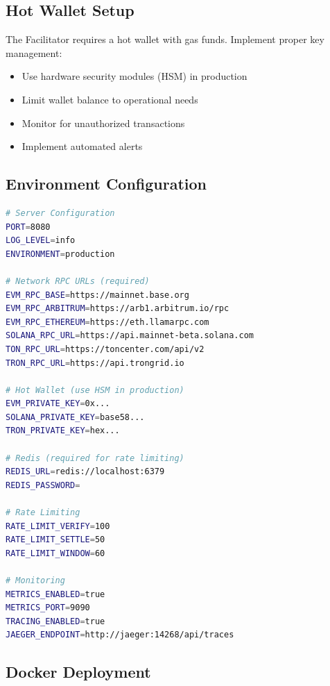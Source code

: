 \subsection{Hot Wallet Setup}

\begin{warningbox}
The Facilitator requires a hot wallet with gas funds. Implement proper key management:
\begin{itemize}
    \item Use hardware security modules (HSM) in production
    \item Limit wallet balance to operational needs
    \item Monitor for unauthorized transactions
    \item Implement automated alerts
\end{itemize}
\end{warningbox}

\subsection{Environment Configuration}

\begin{lstlisting}[language=bash,caption={Facilitator environment variables}]
# Server Configuration
PORT=8080
LOG_LEVEL=info
ENVIRONMENT=production

# Network RPC URLs (required)
EVM_RPC_BASE=https://mainnet.base.org
EVM_RPC_ARBITRUM=https://arb1.arbitrum.io/rpc
EVM_RPC_ETHEREUM=https://eth.llamarpc.com
SOLANA_RPC_URL=https://api.mainnet-beta.solana.com
TON_RPC_URL=https://toncenter.com/api/v2
TRON_RPC_URL=https://api.trongrid.io

# Hot Wallet (use HSM in production)
EVM_PRIVATE_KEY=0x...
SOLANA_PRIVATE_KEY=base58...
TRON_PRIVATE_KEY=hex...

# Redis (required for rate limiting)
REDIS_URL=redis://localhost:6379
REDIS_PASSWORD=

# Rate Limiting
RATE_LIMIT_VERIFY=100
RATE_LIMIT_SETTLE=50
RATE_LIMIT_WINDOW=60

# Monitoring
METRICS_ENABLED=true
METRICS_PORT=9090
TRACING_ENABLED=true
JAEGER_ENDPOINT=http://jaeger:14268/api/traces
\end{lstlisting}

\subsection{Docker Deployment}


